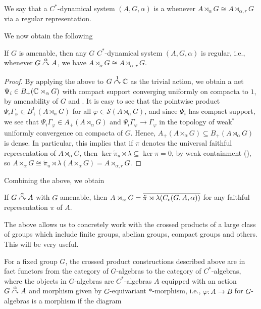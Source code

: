 \begin{definition}
	We say that a $C^*$-dynamical system $(A,G,\alpha)$ is a  whenever $A \rtimes_\alpha G \cong A \rtimes_{\alpha,r} G$ via a regular representation.
\end{definition}
We now obtain the following
\begin{theorem}
If $G$ is amenable, then any $G$ $C^*$-dynamical system $(A,G,\alpha)$ is regular, i.e., whenever $G \stackrel{\alpha}{\curvearrowright} A$, we have $A \rtimes_\alpha G \cong A \rtimes_{\alpha,r}G$.
\label{cross:amenable}
\end{theorem}
\begin{proof}
By applying the above to $G \stackrel{1}{\curvearrowright} \mathbb{C}$ as the trivial action, we obtain a net $\Psi_i \in B_{+}(\mathbb{C} \rtimes_\alpha G)$ with compact support converging uniformly on compacta to $1$, by amenability of $G$ and \cite[Lemma 7.2.4]{pedersenalgauto}. It is easy to see that the pointwise product $\Psi_i \Gamma_\varphi \in B_+^1(A \rtimes_\alpha G)$ for all $\varphi \in \mathcal{S}(A \rtimes_\alpha G)$, and since $\Psi_i$ has compact support, we see that $\Psi_i \Gamma_\varphi \in A_+(A \rtimes_\alpha G)$ and $\Psi_i \Gamma_\varphi \to \Gamma_\varphi$ in the topology of weak$^*$ uniformly convergence on compacta of $G$. Hence, $A_+(A \rtimes_\alpha G) \subseteq B_+(A \rtimes_\alpha G)$ is dense. In particular, this implies that if $\pi$ denotes the universal faithful representation of $A \rtimes_\alpha G$, then $\ker \tilde \pi_u \rtimes \lambda \subseteq \ker \pi = 0$, by weak containment (\cite[80]{dixmier1969c}), so $A \rtimes_\alpha G \cong \tilde \pi_u \rtimes \lambda( A \rtimes_\alpha G) = A \rtimes_{\alpha,r}G$.
\end{proof}
Combining the above, we obtain
\begin{corollary}
If $G \stackrel{\alpha}{\curvearrowright} A$ with $G$ amenable, then $A \rtimes_\alpha G = \overline{\tilde \pi \rtimes \lambda (C_c(G,A,\alpha))}$ for any faithful representation $\pi$ of $A$.
\end{corollary}
The above allows us to concretely work with the crossed products of a large class of groups which include finite groups, abelian groups, compact groups and others. This will be very useful.

For a fixed group $G$, the crossed product constructions described above are in fact functors from the category of $G$-algebras to the category of $C^*$-algebras, where the objects in $G$-algebras are $C^*$-algebras $A$ equipped with an action $G \stackrel{\alpha}{\curvearrowright} A$ and morphism given by $G$-equivariant $*$-morphism, i.e., $\varphi \colon A \to B$ for $G$-algebras is a morphism if the diagram

